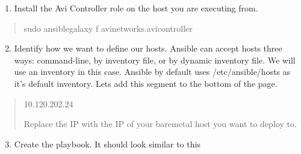 \documentclass[letterpaper,10pt,english]{sphinxmanual}
\begin{document}
\begin{enumerate}
\item {} 
Install the Avi Controller role on the host you are executing from.

\end{enumerate}
\begin{quote}

\begin{sphinxVerbatim}[commandchars=\\\{\}]
sudo ansible\PYGZhy{}galaxy \PYGZhy{}f avinetworks.avicontroller
\end{sphinxVerbatim}
\end{quote}
\begin{enumerate}
\setcounter{enumi}{1}
\item {} 
Identify how we want to define our hosts. Ansible can accept hosts three ways: command-line, by inventory file, or by dynamic inventory file. We will use an inventory in this case. Ansible by default uses /etc/ansible/hosts as it's default inventory. Lets add this segment to the bottom of the page.

\end{enumerate}
\begin{quote}

\begin{sphinxVerbatim}[commandchars=\\\{\}]
[avicontrollers]
10.120.202.24
\end{sphinxVerbatim}

Replace the IP with the IP of your baremetal host you want to deploy to.
\end{quote}
\begin{enumerate}
\setcounter{enumi}{2}
\item {} 
Create the playbook. It should look similar to this

\end{enumerate}
\end{document}

